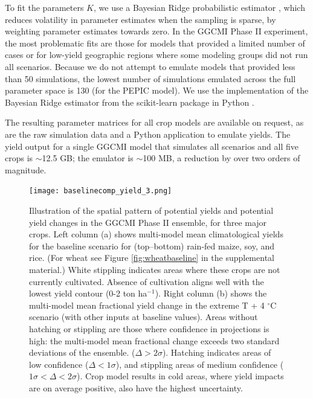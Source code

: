 \documentclass[preprint, 5p, times, twocolumn]{elsarticle}
\begin{document}
To fit the parameters $K$, we use a Bayesian Ridge probabilistic estimator \citep{MacKay91}, which reduces volatility in parameter estimates when the sampling is sparse, by weighting parameter estimates towards zero. In the GGCMI Phase II experiment, the most problematic fits are those for models that provided a limited number of cases or for low-yield geographic regions where some modeling groups did not run all scenarios. Because we do not attempt to emulate models that provided less than 50 simulations, the lowest number of simulations emulated across the full parameter space is 130 (for the PEPIC model). We use the implementation of the Bayesian Ridge estimator from the scikit-learn package in Python \citep{scikit-learn}. 

The resulting parameter matrices for all crop models are available on request, as are the raw simulation data and a Python application to emulate yields. The yield output for a single GGCMI model that simulates all scenarios and all five crops is $\sim$12.5 GB; the emulator is $\sim$100 MB, a reduction by over two orders of magnitude.

\begin{figure}[!htb]
\centering
   \texttt{[image: baselinecomp\_yield\_3.png]} 
   \caption{Illustration of the spatial pattern of potential yields and potential yield changes in the GGCMI Phase II ensemble, for three major crops. Left column (a) shows multi-model mean climatological yields for the baseline scenario for (top--bottom) rain-fed maize, soy, and rice. (For wheat see Figure \ref{fig:wheatbaseline} in the supplemental material.) White stippling indicates areas where these crops are not currently cultivated. Absence of cultivation aligns well with the lowest yield contour (0-2 ton ha$^{-1}$). Right column (b) shows the multi-model mean fractional yield change in the extreme T + 4 $^{\circ}$C scenario (with other inputs at baseline values). Areas without hatching or stippling are those where confidence in projections is high: the multi-model mean fractional change exceeds two standard deviations of the ensemble. ($\Delta > 2\sigma$). Hatching indicates areas of low confidence ($\Delta < 1 \sigma$), and stippling areas of medium confidence ($1 \sigma < \Delta < 2 \sigma$). Crop model results in cold areas, where yield impacts are on average positive, also have the highest uncertainty.}
   \label{fig:maizesoybaseline}
\end{figure}
\end{document}

